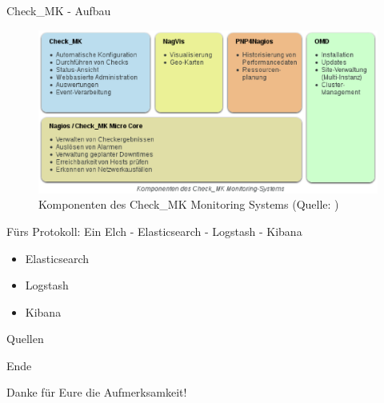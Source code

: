 \documentclass[12pt]{beamer}
\begin{document}
\begin{frame}{Check\_MK - Aufbau}
	\begin{figure}
		\centering
		\includegraphics[width=1\textwidth]{pics/checkMKAufbau.eps}
		\caption[Komponenten des Check\_MK Monitoring Systems]{Komponenten des Check\_MK Monitoring Systems (Quelle: \textcite{checkmkmonitoringpic})}
	\end{figure}
\end{frame}
\begin{frame}{Fürs Protokoll: Ein Elch - Elasticsearch - Logstash - Kibana}
\begin{itemize}
	\item Elasticsearch
	\item Logstash
	\item Kibana
\end{itemize}
\end{frame}
\begin{frame}{Quellen}
	\printbibliography
\end{frame}
\begin{frame}{Ende}
	\begin{center}
	Danke für Eure die Aufmerksamkeit!
	\end{center}
	
\end{frame}
\end{document}
